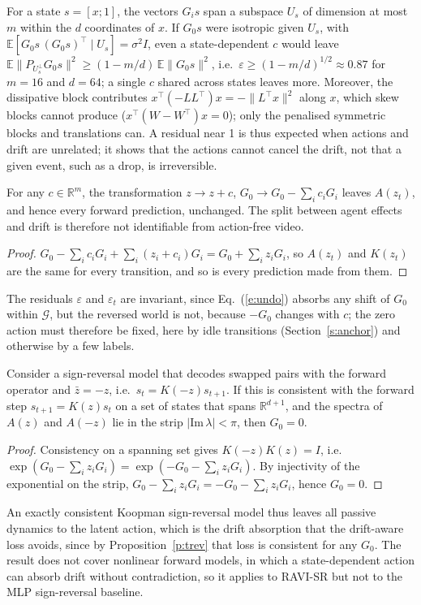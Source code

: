\documentclass{jcse}
\newcommand{\method}{RAVI}
\newcommand{\zb}{\bar{z}}
\newcommand{\R}{\mathbb{R}}
\begin{document}
\begin{remark}
\label{r:eps}
For a state $s=[x;1]$, the vectors $G_is$ span a subspace $U_s$ of dimension at most $m$ within the $d$ coordinates of $x$.
If $G_0s$ were isotropic given $U_s$, with $\mathbb{E}[G_0s\,(G_0s)^\top\mid U_s]=\sigma^2I$, even a state-dependent $c$ would leave $\mathbb{E}\|P_{U_s^\perp}G_0s\|^2\ge(1-m/d)\,\mathbb{E}\|G_0s\|^2$, i.e.\ $\varepsilon\ge(1-m/d)^{1/2}\approx0.87$ for $m=16$ and $d=64$; a single $c$ shared across states leaves more.
Moreover, the dissipative block contributes $x^\top(-LL^\top)x=-\|L^\top x\|^2$ along $x$, which skew blocks cannot produce ($x^\top(W-W^\top)x=0$); only the penalised symmetric blocks and translations can.
A residual near 1 is thus expected when actions and drift are unrelated; it shows that the actions cannot cancel the drift, not that a given event, such as a drop, is irreversible.
\end{remark}

\begin{proposition}
\label{p:gauge}
For any $c\in\R^m$, the transformation $z\to z+c$, $G_0\to G_0-\sum_ic_iG_i$ leaves $A(z_t)$, and hence every forward prediction, unchanged.
The split between agent effects and drift is therefore not identifiable from action-free video.
\end{proposition}
\begin{proof}
$G_0-\sum_ic_iG_i+\sum_i(z_i+c_i)G_i=G_0+\sum_iz_iG_i$, so $A(z_t)$ and $K(z_t)$ are the same for every transition, and so is every prediction made from them.
\end{proof}
The residuals $\varepsilon$ and $\varepsilon_t$ are invariant, since Eq.~(\ref{e:undo}) absorbs any shift of $G_0$ within $\mathcal{G}$, but the reversed world is not, because $-G_0$ changes with $c$; the zero action must therefore be fixed, here by idle transitions (Section~\ref{s:anchor}) and otherwise by a few labels.

\begin{proposition}
\label{p:signrev}
Consider a sign-reversal model that decodes swapped pairs with the forward operator and $\zb=-z$, i.e.\ $s_t=K(-z)s_{t+1}$.
If this is consistent with the forward step $s_{t+1}=K(z)s_t$ on a set of states that spans $\R^{d+1}$, and the spectra of $A(z)$ and $A(-z)$ lie in the strip $|\mathrm{Im}\,\lambda|<\pi$, then $G_0=0$.
\end{proposition}
\begin{proof}
Consistency on a spanning set gives $K(-z)K(z)=I$, i.e.\ $\exp(G_0-\sum_iz_iG_i)=\exp(-G_0-\sum_iz_iG_i)$.
By injectivity of the exponential on the strip, $G_0-\sum_iz_iG_i=-G_0-\sum_iz_iG_i$, hence $G_0=0$.
\end{proof}
An exactly consistent Koopman sign-reversal model thus leaves all passive dynamics to the latent action, which is the drift absorption that the drift-aware loss avoids, since by Proposition~\ref{p:trev} that loss is consistent for any $G_0$.
The result does not cover nonlinear forward models, in which a state-dependent action can absorb drift without contradiction, so it applies to {\method}-SR but not to the MLP sign-reversal baseline.
\end{document}
